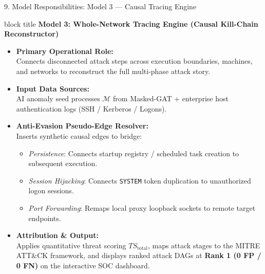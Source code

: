 \documentclass[aspectratio=169,10pt]{beamer}
\begin{document}
\begin{frame}{9. Model Responsibilities: Model 3 — Causal Tracing Engine}
\vspace{0.15em}
\begin{beamercolorbox}[rounded=true,shadow=false,sep=0.35em,wd=\textwidth]{block title}
\textbf{\scriptsize Model 3: Whole-Network Tracing Engine (Causal Kill-Chain Reconstructor)}
\end{beamercolorbox}
\vspace{0.15em}
{\fontsize{7.5pt}{10.5pt}\selectfont
\begin{itemize}\itemsep0.22em
  \item \textbf{Primary Operational Role:}\\
  Connects disconnected attack steps across execution boundaries, machines, and networks to reconstruct the full multi-phase attack story.
  \item \textbf{Input Data Sources:}\\
  AI anomaly seed processes $\mathcal{M}$ from Masked-GAT + enterprise host authentication logs (SSH / Kerberos / Logons).
  \item \textbf{Anti-Evasion Pseudo-Edge Resolver:}\\
  Inserts synthetic causal edges to bridge:
  \begin{itemize}\itemsep0.12em
    \item \textit{Persistence}: Connects startup registry / scheduled task creation to subsequent execution.
    \item \textit{Session Hijacking}: Connects \texttt{SYSTEM} token duplication to unauthorized logon sessions.
    \item \textit{Port Forwarding}: Remaps local proxy loopback sockets to remote target endpoints.
  \end{itemize}
  \item \textbf{Attribution \& Output:}\\
  Applies quantitative threat scoring $TS_{\text{total}}$, maps attack stages to the MITRE ATT\&CK framework, and displays ranked attack DAGs at \textbf{Rank 1 (0 FP / 0 FN)} on the interactive SOC dashboard.
\end{itemize}
}
\end{frame}
\end{document}
